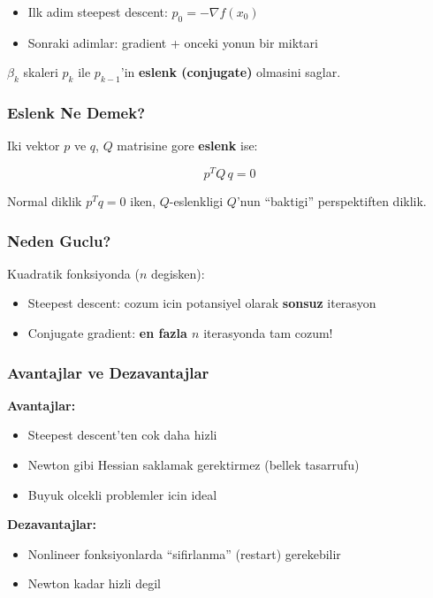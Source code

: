 \documentclass[12pt,a4paper]{article}
\theoremstyle{definition}
\theoremstyle{remark}
\begin{document}
\begin{itemize}[leftmargin=*, itemsep=0.2em]
\item Ilk adim steepest descent: $p_0 = -\nabla f(x_0)$
\item Sonraki adimlar: gradient + onceki yonun bir miktari
\end{itemize}

$\beta_k$ skaleri $p_k$ ile $p_{k-1}$'in \textbf{eslenk (conjugate)} olmasini saglar.

\subsubsection{Eslenk Ne Demek?}

Iki vektor $p$ ve $q$, $Q$ matrisine gore \textbf{eslenk} ise:

\[
p^T Q \, q = 0
\]

Normal diklik $p^T q = 0$ iken, $Q$-eslenkligi $Q$'nun ``baktigi'' perspektiften diklik.

\subsubsection{Neden Guclu?}

Kuadratik fonksiyonda ($n$ degisken):
\begin{itemize}[leftmargin=*, itemsep=0.2em]
\item Steepest descent: cozum icin potansiyel olarak \textbf{sonsuz} iterasyon
\item Conjugate gradient: \textbf{en fazla $n$} iterasyonda tam cozum!
\end{itemize}

\subsubsection{Avantajlar ve Dezavantajlar}

\textbf{Avantajlar:}
\begin{itemize}[leftmargin=*, itemsep=0.2em]
\item Steepest descent'ten cok daha hizli
\item Newton gibi Hessian saklamak gerektirmez (bellek tasarrufu)
\item Buyuk olcekli problemler icin ideal
\end{itemize}

\textbf{Dezavantajlar:}
\begin{itemize}[leftmargin=*, itemsep=0.2em]
\item Nonlineer fonksiyonlarda ``sifirlanma'' (restart) gerekebilir
\item Newton kadar hizli degil
\end{itemize}
\end{document}

